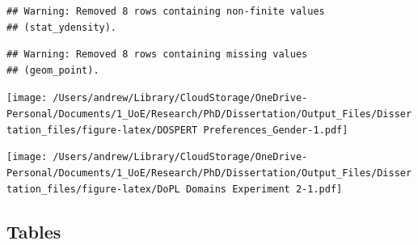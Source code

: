\documentclass[
  donotrepeattitle,doc, 12pt, a4paper,floatsintext]{apa7}
\begin{document}
\begin{verbatim}
## Warning: Removed 8 rows containing non-finite values
## (stat_ydensity).
\end{verbatim}

\begin{verbatim}
## Warning: Removed 8 rows containing missing values
## (geom_point).
\end{verbatim}

\texttt{[image: /Users/andrew/Library/CloudStorage/OneDrive-Personal/Documents/1\_UoE/Research/PhD/Dissertation/Output\_Files/Dissertation\_files/figure-latex/DOSPERT Preferences\_Gender-1.pdf]}

\texttt{[image: /Users/andrew/Library/CloudStorage/OneDrive-Personal/Documents/1\_UoE/Research/PhD/Dissertation/Output\_Files/Dissertation\_files/figure-latex/DoPL Domains Experiment 2-1.pdf]}

\newpage

\hypertarget{tables}{%
\subsection{Tables}\label{tables}}
\end{document}
